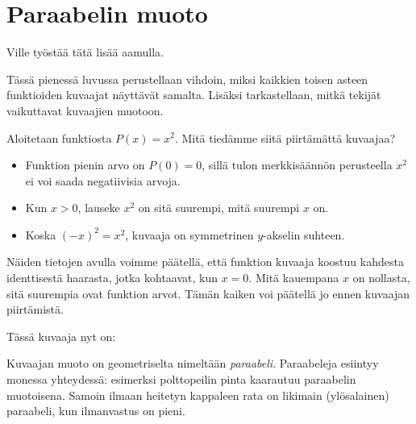 \chapter{Paraabelin muoto}

Ville työstää tätä lisää aamulla.

Tässä pienessä luvussa perustellaan vihdoin, miksi kaikkien toisen asteen funktioiden
kuvaajat näyttävät samalta. Lisäksi tarkastellaan, mitkä tekijät vaikuttavat kuvaajien
muotoon.

Aloitetaan funktiosta $P(x)=x^2$. Mitä tiedämme siitä piirtämättä kuvaajaa?
\begin{itemize}
\item Funktion pienin arvo on $P(0) = 0$, sillä tulon merkkisäännön perusteella $x^2$ ei voi saada negatiivisia arvoja.
\item Kun $x > 0$, lauseke $x^2$  on sitä
suurempi, mitä suurempi $x$ on.
\item Koska $(-x)^2 = x^2$, kuvaaja on symmetrinen $y$-akselin suhteen. 
\end{itemize}  

Näiden tietojen avulla voimme päätellä, että funktion kuvaaja koostuu kahdesta
identtisestä haarasta, jotka kohtaavat, kun $x=0$. Mitä kauempana $x$ on nollasta,
sitä suurempia ovat funktion arvot. Tämän kaiken voi päätellä jo ennen kuvaajan
piirtämistä.

Tässä kuvaaja nyt on:
\begin{center}
\begin{kuvaajapohja}{2}{-2}{2}{-1}{4}
\end{kuvaajapohja}
\end{center}
Kuvaajan muoto on geometriselta nimeltään \emph{paraabeli}. Paraabeleja esiintyy monessa yhteydessä: esimerksi polttopeilin pinta kaarautuu paraabelin muotoisena. Samoin ilmaan heitetyn kappaleen
rata on likimain (ylösalainen) paraabeli, kun ilmanvastus on pieni.

